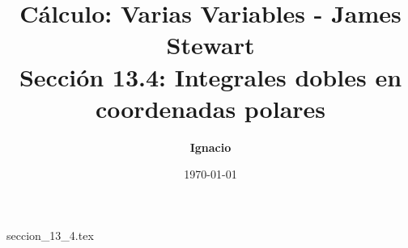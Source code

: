 \documentclass[11pt,spanish,oneside]{report}
\title{\textbf{Cálculo: Varias Variables - James Stewart} \\ \Large Sección 13.4: Integrales dobles en coordenadas polares}
\author{\textbf{Ignacio}}
\date{\today}
\begin{document}
\maketitle

{seccion_13_4.tex}
\end{document}
